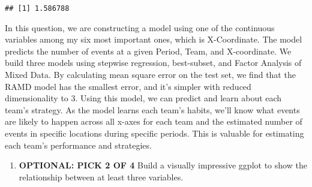 \documentclass[
  a3paper,
]{article}
\newenvironment{Shaded}{\begin{snugshade}}{\end{snugshade}}
\newcommand{\AttributeTok}[1]{\textcolor[rgb]{0.13,0.29,0.53}{#1}}
\newcommand{\CommentTok}[1]{\textcolor[rgb]{0.56,0.35,0.01}{\textit{#1}}}
\newcommand{\ConstantTok}[1]{\textcolor[rgb]{0.56,0.35,0.01}{#1}}
\newcommand{\DecValTok}[1]{\textcolor[rgb]{0.00,0.00,0.81}{#1}}
\newcommand{\FunctionTok}[1]{\textcolor[rgb]{0.13,0.29,0.53}{\textbf{#1}}}
\newcommand{\NormalTok}[1]{#1}
\newcommand{\OtherTok}[1]{\textcolor[rgb]{0.56,0.35,0.01}{#1}}
\newcommand{\SpecialCharTok}[1]{\textcolor[rgb]{0.81,0.36,0.00}{\textbf{#1}}}
\providecommand{\tightlist}{%
  \setlength{\itemsep}{0pt}\setlength{\parskip}{0pt}}
\begin{document}
\begin{Shaded}
\end{Shaded}

\begin{verbatim}
## [1] 1.586788
\end{verbatim}

In this question, we are constructing a model using one of the
continuous variables among my six most important ones, which is
X-Coordinate. The model predicts the number of events at a given Period,
Team, and X-coordinate. We build three models using stepwise regression,
best-subset, and Factor Analysis of Mixed Data. By calculating mean
square error on the test set, we find that the RAMD model has the
smallest error, and it's simpler with reduced dimensionality to 3. Using
this model, we can predict and learn about each team's strategy. As the
model learns each team's habits, we'll know what events are likely to
happen across all x-axes for each team and the estimated number of
events in specific locations during specific periods. This is valuable
for estimating each team's performance and strategies.

\newpage

\vspace{2cm}

\begin{enumerate}
\def\labelenumi{\arabic{enumi})}
\setcounter{enumi}{5}
\tightlist
\item
  \textbf{OPTIONAL: PICK 2 OF 4} Build a visually impressive ggplot to
  show the relationship between at least three variables.
\end{enumerate}
\end{document}
